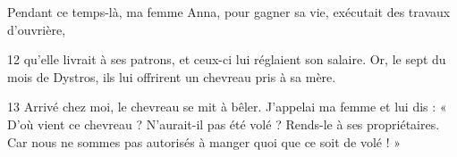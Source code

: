 Pendant ce temps-là, ma femme Anna, pour gagner sa vie, exécutait des travaux d’ouvrière,

12 qu’elle livrait à ses patrons, et ceux-ci lui réglaient son salaire. Or, le sept du mois de Dystros, ils lui offrirent un chevreau pris à sa mère.

13 Arrivé chez moi, le chevreau se mit à bêler. J’appelai ma femme et lui dis : « D’où vient ce chevreau ? N’aurait-il pas été volé ? Rends-le à ses propriétaires. Car nous ne sommes pas autorisés à manger quoi que ce soit de volé ! »